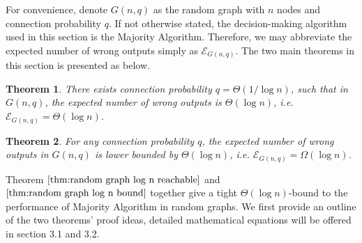 \documentclass[a4paper,UKenglish]{lipics}
\newtheorem{thm}{Theorem}[section] %
\theoremstyle{definition}
\begin{document}
For convenience, denote $G(n, q)$ as the random graph with $n$ nodes and connection probability $q$.
If not otherwise stated, the decision-making algorithm used in this section is the Majority Algorithm.
Therefore, we may abbreviate the expected number of wrong outputs simply as $\mathcal{E}_{G(n,q)}$.
The two main theorems in this section is presented as below.

\begin{thm}
\label{thm:random graph log n reachable}
There exists connection probability $q = \Theta(1/\log n)$, such that in $G(n, q)$, the expected number of wrong outputs is $\Theta(\log n)$,	
	i.e. $\mathcal{E}_{G(n,q)} = \Theta(\log n)$.
\end{thm}

\begin{thm}
\label{thm:random graph log n bound}
For any connection probability $q$, the expected number of wrong outputs in $G(n,q)$ is lower bounded by $\Theta(\log n)$,
	i.e. $\mathcal{E}_{G(n,q)} = \Omega(\log n)$.
\end{thm}

Theorem $\ref{thm:random graph log n reachable}$ and $\ref{thm:random graph log n bound}$
together give a tight $\Theta(\log n)$-bound to the performance of Majority Algorithm in random graphs.
We first provide an outline of the two theorems' proof ideas, detailed mathematical equations will be offered in section 3.1 and 3.2.
\end{document}
